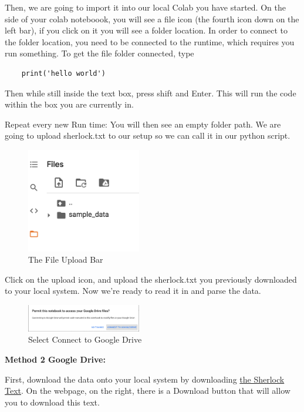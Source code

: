 \documentclass{article}
\begin{document}
Then, we are going to import it into our local Colab you have started. On the side of your colab noteboook, you will see a file icon (the fourth icon down on the left bar), if you click on it you will see a folder location. In order to connect to the folder location, you need to be connected to the runtime, which requires you run something. To get the file folder connected, type
\begin{verbatim}
    print('hello world')
\end{verbatim} 
Then while still inside the text box, press shift and Enter. This will run the code within the box you are currently in.

Repeat every new Run time:
You will then see an empty folder path. We are going to upload sherlock.txt to our setup so we can call it in our python script.

\begin{figure}[h!]
\centering
\includegraphics[width=50mm]{FileFolder.png}
\caption{The File Upload Bar}
\label{fig:filefolder}
\end{figure}

Click on the upload icon, and upload the sherlock.txt you previously downloaded to your local system. Now we're ready to read it in and parse the data.

\begin{figure}[h!]
\centering
\includegraphics[width=50mm]{GoogleDriveConnect.png}
\caption{Select Connect to Google Drive}
\label{fig:connectdrive}
\end{figure}

\textbf{Method 2 Google Drive:}

First, download the data onto your local system by downloading 
\href{https://github.com/CatMcQueen/catmcqueen.github.io/blob/b67a282c9be6bfd1ed17796c2507b9108cffb6bc/sherlock.txt}{the Sherlock Text}. On the webpage, on the right, there is a Download button that will allow you to download this text.
\end{document}
